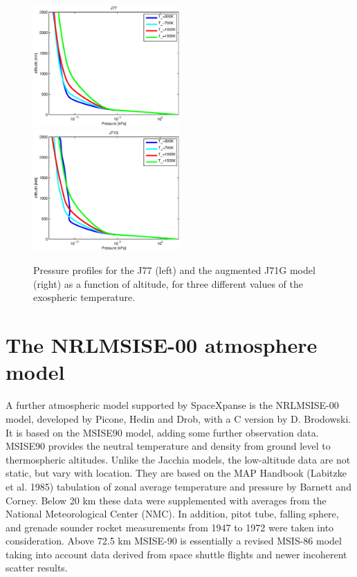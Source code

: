 \documentclass[a4paper]{article}
\begin{document}
\begin{figure}
\includegraphics[width=0.5\textwidth]{prs_j77.eps}
\includegraphics[width=0.5\textwidth]{prs_j71g.eps}
\caption{Pressure profiles for the J77 (left) and the augmented J71G model (right) as a function of altitude, for three different values of the exospheric temperature.}
\label{fig:pressure}
\end{figure}

\section{The NRLMSISE-00 atmosphere model}
A further atmospheric model supported by SpaceXpanse is the NRLMSISE-00 model, developed by Picone, Hedin and Drob, with a C version by D. Brodowski. It is based on the MSISE90 model, adding some further observation data. MSISE90 provides the neutral temperature and density from ground level to thermospheric altitudes. Unlike the Jacchia models, the low-altitude data are not static, but vary with location. They are based on the MAP Handbook (Labitzke et al. 1985) tabulation of zonal average temperature and pressure by Barnett and Corney. Below 20 km these data were supplemented with averages from the National Meteorological Center (NMC). In addition, pitot tube, falling sphere, and grenade sounder rocket measurements from 1947 to 1972 were taken into consideration. Above 72.5 km MSISE-90 is essentially a revised MSIS-86 model taking into account data derived from space shuttle flights and newer incoherent scatter results.
\end{document}
